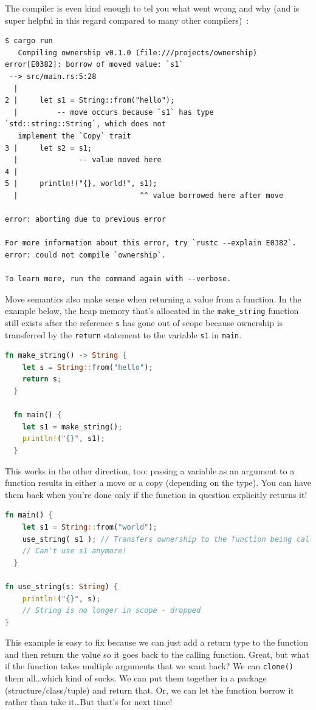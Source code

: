 The compiler is even kind enough to tel you what went wrong and why (and is super helpful in this regard compared to many other compilers)~\cite{rustdocs}:
\begin{verbatim}
$ cargo run
   Compiling ownership v0.1.0 (file:///projects/ownership)
error[E0382]: borrow of moved value: `s1`
 --> src/main.rs:5:28
  |
2 |     let s1 = String::from("hello");
  |         -- move occurs because `s1` has type `std::string::String`, which does not
   implement the `Copy` trait
3 |     let s2 = s1;
  |              -- value moved here
4 | 
5 |     println!("{}, world!", s1);
  |                            ^^ value borrowed here after move

error: aborting due to previous error

For more information about this error, try `rustc --explain E0382`.
error: could not compile `ownership`.

To learn more, run the command again with --verbose.
\end{verbatim}

Move semantics also make sense when returning a value from a function. In the example below, the heap memory that's allocated in the \texttt{make\_string} function still exists after the reference \texttt{s} has gone out of scope because ownership is transferred by the \texttt{return} statement to the variable \texttt{s1} in \texttt{main}.

\begin{lstlisting}[language=Rust]
  fn make_string() -> String {
    let s = String::from("hello");
    return s;
  }

  fn main() {
    let s1 = make_string();
    println!("{}", s1);
  }
\end{lstlisting}

This works in the other direction, too: passing a variable as an argument to a function results in either a move or a copy (depending on the type). You can have them back when you're done only if the function in question explicitly returns it! 

\begin{lstlisting}[language=Rust]
  fn main() {
    let s1 = String::from("world");
	use_string( s1 ); // Transfers ownership to the function being called
	// Can't use s1 anymore!
  }
  
fn use_string(s: String) {
    println!("{}", s); 
    // String is no longer in scope - dropped
}
\end{lstlisting}

This example is easy to fix because we can just add a return type to the function and then return the value so it goes back to the calling function. Great, but what if the function takes multiple arguments that we want back? We can \texttt{clone()} them all\ldots which kind of sucks. We can put them together in a package (structure/class/tuple) and return that. Or, we can let the function borrow it rather than take it\ldots But that's for next time!

